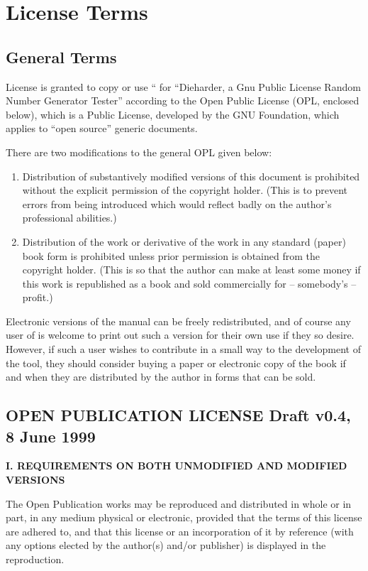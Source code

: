 \newpage
\appendix
\chapter{License Terms}

\section{General Terms}

License is granted to copy or use `` for ``Dieharder, a Gnu Public
License Random Number Generator Tester'' according to the Open Public
License (OPL, enclosed below), which is a Public License, developed by
the GNU Foundation, which applies to ``open source'' generic documents.

There are two modifications to the general OPL given below:
\begin{enumerate}
 \item Distribution of substantively modified versions of this document
is prohibited without the explicit permission of the copyright holder.
(This is to prevent errors from being introduced which would reflect
badly on the author's professional abilities.)

 \item Distribution of the work or derivative of the work in any
standard (paper) book form is prohibited unless prior permission is
obtained from the copyright holder. (This is so that the author can make
at least some money if this work is republished as a book and sold
commercially for -- somebody's -- profit.)
\end{enumerate}

Electronic versions of the \die manual can be freely redistributed, and
of course any user of \die is welcome to print out such a version for
their own use if they so desire.  However, if such a user wishes to
contribute in a small way to the development of the tool, they should
consider buying a paper or electronic copy of the book if and when they
are distributed by the author in forms that can be sold.

\section{OPEN PUBLICATION LICENSE Draft v0.4, 8 June 1999}

{\bf I. REQUIREMENTS ON BOTH UNMODIFIED AND MODIFIED VERSIONS}

The Open Publication works may be reproduced and distributed in whole or
in part, in any medium physical or electronic, provided that the terms
of this license are adhered to, and that this license or an
incorporation of it by reference (with any options elected by the
author(s) and/or publisher) is displayed in the reproduction.

